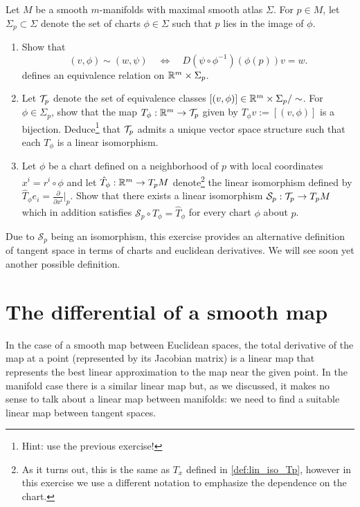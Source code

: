 \begin{exe}
Let $M$ be a smooth $m$-manifolds with maximal smooth atlas $\Sigma$.
For $p\in M$, let $\Sigma_p \subset \Sigma$ denote the set of charts $\phi\in\Sigma$ such that $p$ lies in the image of $\phi$.
\begin{enumerate}
    \item Show that
    \begin{equation}
        (v,\phi) \sim (w, \psi)
        \quad\Longleftrightarrow\quad
        D(\psi \circ \phi^{-1})(\phi(p))v = w.
    \end{equation}
    defines an equivalence relation on $\mathbb{R}^m\times\Sigma_p$.
    \item Let $\mathcal{T}_p$ denote the set of equivalence classes $[(v,\phi)]\in \mathbb{R}^m\times\Sigma_p/\sim$. For $\phi\in\Sigma_p$, show that the map $T_\phi:\mathbb{R}^m\to\mathcal{T}_p$ given by $T_\phi v := [(v,\phi)]$ is a bijection.
    Deduce\footnote{Hint: use the previous exercise!} that $\mathcal{T}_p$ admits a unique vector space structure such that each $T_\phi$ is a linear isomorphism.
    \item Let $\phi$ be a chart defined on a neighborhood of $p$ with local coordinates $x^i = r^i \circ \phi$ and let $\hat T_\phi :\mathbb{R}^m \to T_pM$ denote\footnote{As it turns out, this is the same as $T_x$ defined in \eqref{def:lin_iso_Tp}, however in this exercise we use a different notation to emphasize the dependence on the chart.} the linear isomorphism defined by $\hat T_\phi e_i = \frac{\partial}{\partial x^i}\big|_p$.
    Show that there exists a linear isomorphism $\mathcal{S}_p:\mathcal{T}_p\to T_pM$ which in addition satisfies $\mathcal{S}_p \circ T_\phi = \hat T_\phi$ for every chart $\phi$ about $p$.
\end{enumerate}
\end{exe}

Due to $\mathcal{S}_p$ being an isomorphism, this exercise provides an alternative definition of tangent space in terms of charts and euclidean derivatives.
We will see soon yet another possible definition.

\section{The differential of a smooth map}

In the case of a smooth map between Euclidean spaces, the total derivative of the map at a point (represented by its Jacobian matrix) is a linear map that represents the best linear approximation to the map near the given point.
In the manifold case there is a similar linear map but, as we discussed, it makes no sense to talk about a linear map between manifolds: we need to find a suitable linear map between tangent spaces.

